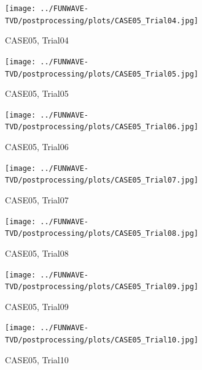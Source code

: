 \documentclass[preprint,10pt]{elsarticle}
\begin{document}
\begin{figure}
\begin{center}
 \texttt{[image: ../FUNWAVE-TVD/postprocessing/plots/CASE05\_Trial04.jpg]}
 \caption{CASE05, Trial04}
 \label{lineargrid}
 \end{center}
 \end{figure}

\begin{figure}
\begin{center}
 \texttt{[image: ../FUNWAVE-TVD/postprocessing/plots/CASE05\_Trial05.jpg]}
 \caption{CASE05, Trial05}
 \label{lineargrid}
 \end{center}
 \end{figure}

 \begin{figure}
\begin{center}
 \texttt{[image: ../FUNWAVE-TVD/postprocessing/plots/CASE05\_Trial06.jpg]}
 \caption{CASE05, Trial06}
 \label{lineargrid}
 \end{center}
 \end{figure}

\begin{figure}
\begin{center}
 \texttt{[image: ../FUNWAVE-TVD/postprocessing/plots/CASE05\_Trial07.jpg]}
 \caption{CASE05, Trial07}
 \label{lineargrid}
 \end{center}
 \end{figure}

\begin{figure}
\begin{center}
 \texttt{[image: ../FUNWAVE-TVD/postprocessing/plots/CASE05\_Trial08.jpg]}
 \caption{CASE05, Trial08}
 \label{lineargrid}
 \end{center}
 \end{figure}
 
\begin{figure}
\begin{center}
 \texttt{[image: ../FUNWAVE-TVD/postprocessing/plots/CASE05\_Trial09.jpg]}
 \caption{CASE05, Trial09}
 \label{lineargrid}
 \end{center}
 \end{figure}

\begin{figure}
\begin{center}
 \texttt{[image: ../FUNWAVE-TVD/postprocessing/plots/CASE05\_Trial10.jpg]}
 \caption{CASE05, Trial10}
 \label{lineargrid}
 \end{center}
 \end{figure}
\end{document}
